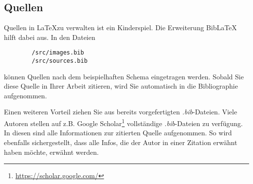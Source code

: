 \subsection{Quellen}
    Quellen in \LaTeX zu verwalten ist ein Kinderspiel. Die Erweiterung BibLaTeX hilft dabei aus. In den Dateien \begin{verbatim}
        /src/images.bib
        /src/sources.bib
    \end{verbatim}
    können Quellen nach dem beispielhaften Schema eingetragen werden. Sobald Sie diese Quelle in Ihrer Arbeit zitieren, wird Sie automatisch in die Bibliographie aufgenommen.

    Einen weiteren Vorteil ziehen Sie aus bereits vorgefertigten \emph{.bib}-Dateien. Viele Autoren stellen auf z.B. Google Scholar\footnote{\url{https://scholar.google.com/}} vollständige \emph{.bib}-Dateien zu verfügung.
    In diesen sind alle Informationen zur zitierten Quelle aufgenommen. So wird ebenfalls sichergestellt, dass alle Infos, die der Autor in einer Zitation erwähnt haben möchte, erwähnt werden.

